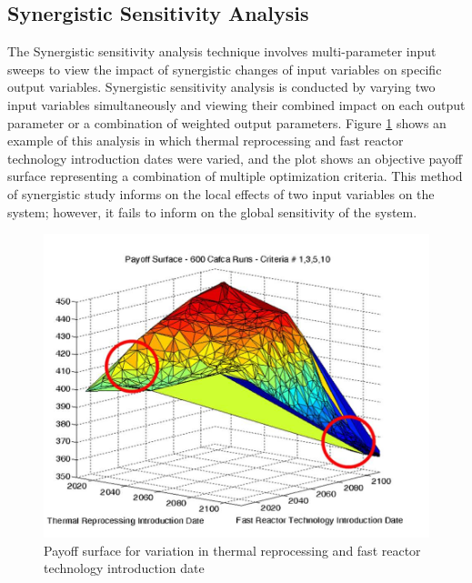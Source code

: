 \subsection{Synergistic Sensitivity Analysis}
The Synergistic sensitivity analysis technique involves multi-parameter 
input sweeps to view the impact of synergistic 
changes of input variables on specific output variables. 
Synergistic sensitivity analysis is conducted by varying 
two input variables simultaneously and viewing their 
combined impact on each output parameter or a combination 
of weighted output parameters. 
Figure \ref{fig:passerini_payoff} shows an example of this analysis 
in which thermal reprocessing and fast reactor technology 
introduction dates were varied, and the plot shows an objective 
payoff surface representing a combination of multiple optimization 
criteria. 
This method of synergistic study informs on the local effects of 
two input variables on the system; however, it fails to inform 
on the global sensitivity of the system. 

\begin{figure}[]
	\begin{center}
		\includegraphics[scale=0.45]{./figures/passerini_payoff.jpg}
	\end{center}	
		\caption{Payoff surface for variation in thermal 
		reprocessing and fast reactor technology introduction date
		\cite{passerini_systematic_2014}}
	\label{fig:passerini_payoff}
\end{figure} 

